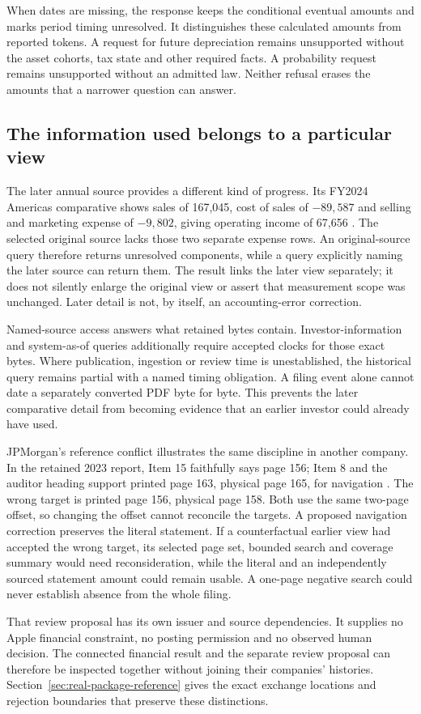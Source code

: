 When dates are missing, the response keeps the conditional eventual amounts
and marks period timing unresolved. It distinguishes these calculated amounts
from reported tokens. A request for future depreciation remains unsupported
without the asset cohorts, tax state and other required facts. A probability
request remains unsupported without an admitted law. Neither refusal erases
the amounts that a narrower question can answer.

\subsection{The information used belongs to a particular view}

The later annual source provides a different kind of progress. Its FY2024
Americas comparative shows sales of 167,045, cost of sales of $-89,587$ and
selling and marketing expense of $-9,802$, giving operating income of 67,656
\citep[Note 13, FY2024 Americas comparative]{apple2025annual}.
The selected original source lacks those two separate expense rows. An
original-source query therefore returns unresolved components, while a query
explicitly naming the later source can return them. The result links the later
view separately; it does not silently enlarge the original view or assert
that measurement scope was unchanged. Later detail is not, by itself, an
accounting-error correction.

Named-source access answers what retained bytes contain. Investor-information
and system-as-of queries additionally require accepted clocks for those exact
bytes. Where publication, ingestion or review time is unestablished, the
historical query remains partial with a named timing obligation. A filing
event alone cannot date a separately converted PDF byte for byte. This prevents
the later comparative detail from becoming evidence that an earlier investor
could already have used.

JPMorgan's reference conflict illustrates the same discipline in another
company. In the retained 2023 report, Item 15 faithfully says page 156; Item 8
and the auditor heading support printed page 163, physical page 165, for
navigation \citep[Items 8 and 15; printed pp.~156 and 163]{jpmorgan2023tenk}.
The wrong target is printed page 156, physical page 158. Both use
the same two-page offset, so changing the offset cannot reconcile the targets.
A proposed navigation correction preserves the literal statement. If a
counterfactual earlier view had accepted the wrong target, its selected page
set, bounded search and coverage summary would need reconsideration, while
the literal and an independently sourced statement amount could remain usable.
A one-page negative search could never establish absence from the whole filing.

That review proposal has its own issuer and source dependencies. It supplies
no Apple financial constraint, no posting permission and no observed human
decision. The connected financial result and the separate review proposal can
therefore be inspected together without joining their companies' histories.
Section~\ref{sec:real-package-reference} gives the exact exchange locations
and rejection boundaries that preserve these distinctions.
